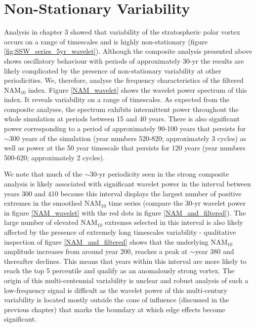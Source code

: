 \section{Non-Stationary Variability}
Analysis in chapter 3 showed that variability of the stratospheric polar vortex  occurs on a range of timescales and is highly non-stationary  (figure \ref{fig:SSW_series_5yr_wavelet}). Although the composite analysis presented above shows oscillatory behaviour with periods of approximately 30-yr the results are likely complicated by the presence of  non-stationary variability at other periodicities.  We, therefore, analyse the frequency characteristics of the filtered NAM$_{10}$ index. Figure \ref{NAM_wavelet} shows the wavelet power spectrum of this index. It reveals variability on a range of timescales. As expected from the composite analyses, the spectrum exhibits intermittent power throughout the whole simulation at periods between 15 and 40 years. There is also significant power corresponding to a period of approximately 90-100 years that persists for $\sim$300 years of the simulation (year numbers 520-820; approximately 3 cycles) as well as power at the 50 year timescale that persists for 120 years (year numbers 500-620; approximately 2 cycles). 

We note that much of the $\sim$30-yr periodicity seen in the strong composite analysis is likely associated with significant wavelet power in the interval between years 300 and 410 because this interval displays the largest number of positive extremes in the smoothed NAM$_{10}$ time series (compare the 30-yr wavelet power in figure \ref{NAM_wavelet} with  the red dots in figure \ref{NAM_and_filtered}). The large number of elevated NAM$_{10}$ extremes selected in this interval is also likely affected by the presence of extremely long timescales variability - qualitative inspection of figure \ref{NAM_and_filtered} shows that the underlying NAM$_{10}$ amplitude increases from around year 200, reaches a peak at $\sim$year 380 and thereafter declines. This means that years within this interval are more likely to reach the top 5 percentile and qualify as an anomalously strong vortex. The origin of this multi-centennial variability is unclear and robust analysis of such a low-frequency signal is difficult as the wavelet power of this multi-century variability is located mostly outside the cone of influence (discussed in the previous chapter) that marks the boundary at which edge effects become significant. 

